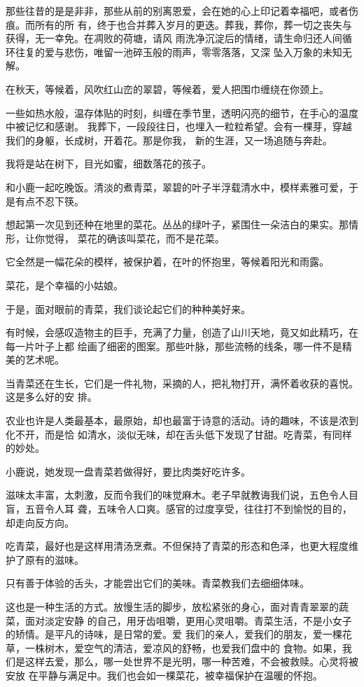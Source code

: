 		那些往昔的是是非非，那些从前的别离恩爱，会在她的心上印记着幸福吧，或者伤痕。而所有的所
	有，终于也合并葬入岁月的更迭。葬我，葬你，葬一切之丧失与获得，无一幸免。在凋败的荷塘，请风
	雨洗净沉淀后的情绪，请生命归还人间循环往复的爱与悲伤，唯留一池碎玉般的雨声，零零落落，又深
	坠入万象的未知无解。

		在秋天，等候着，风吹红山峦的翠碧，等候着，爱人把围巾缠绕在你颈上。

		一些如热水般，温存体贴的时刻，纠缠在季节里，透明闪亮的细节，在手心的温度中被记忆和感谢。
	我葬下，一段段往日，也埋入一粒粒希望。会有一棵芽，穿越我们的身躯，长成树，开着花。那是你我，
	新的生涯，又一场追随与奔赴。

		我将是站在树下，目光如蜜，细数落花的孩子。

	\endwriting



		和小鹿一起吃晚饭。清淡的煮青菜，翠碧的叶子半浮载清水中，模样素雅可爱，于是有点不忍下筷。

		想起第一次见到还种在地里的菜花。丛丛的绿叶子，紧围住一朵洁白的果实。那情形，让你觉得，
	菜花的确该叫菜花，而不是花菜。

		它全然是一幅花朵的模样，被保护着，在叶的怀抱里，等候着阳光和雨露。

		菜花，是个幸福的小姑娘。

		于是，面对眼前的青菜，我们谈论起它们的种种美好来。

		有时候，会感叹造物主的巨手，充满了力量，创造了山川天地，竟又如此精巧，在每一片叶子上都
	绘画了细密的图案。那些叶脉，那些流畅的线条，哪一件不是精美的艺术呢。

		当青菜还在生长，它们是一件礼物，采摘的人，把礼物打开，满怀着收获的喜悦。这是多么好的安
	排。

		农业也许是人类最基本，最原始，却也最富于诗意的活动。诗的趣味，不该是浓到化不开，而是恰
	如清水，淡似无味，却在舌头低下发现了甘甜。吃青菜，有同样的妙处。

		小鹿说，她发现一盘青菜若做得好，要比肉类好吃许多。

		滋味太丰富，太刺激，反而令我们的味觉麻木。老子早就教诲我们说，五色令人目盲，五音令人耳
	聋，五味令人口爽。感官的过度享受，往往打不到愉悦的目的，却走向反方向。

		吃青菜，最好也是这样用清汤烹煮。不但保持了青菜的形态和色泽，也更大程度维护了原有的滋味。

		只有善于体验的舌头，才能尝出它们的美味。青菜教我们去细细体味。

		这也是一种生活的方式。放慢生活的脚步，放松紧张的身心，面对青青翠翠的蔬菜，面对淡定安静
	的自己，用牙齿咀嚼，更用心灵咀嚼。青菜生活，不是小女子的矫情。是平凡的诗味，是日常的爱。爱
	我们的亲人，爱我们的朋友，爱一棵花草，一株树木，爱空气的清洁，爱凉风的舒畅，也爱我们盘中的
	食物。如果，我们是这样去爱，那么，哪一处世界不是光明，哪一种苦难，不会被救赎。心灵将被安放
	在平静与满足中。我们也会如一棵菜花，被幸福保护在温暖的怀抱。

